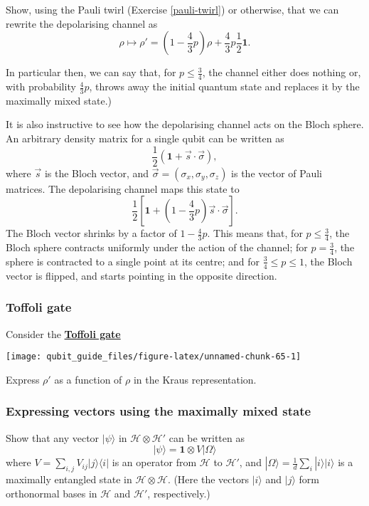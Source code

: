 \documentclass[fleqn]{article}
\begin{document}
Show, using the Pauli twirl (Exercise \ref{pauli-twirl}) or otherwise, that we can rewrite the depolarising channel as
\[
  \rho \longmapsto \rho'
  = \left(1-\frac{4}{3} p\right) \rho + \frac{4}{3}p\frac{1}{2}\mathbf{1}.
\]

In particular then, we can say that, for \(p\leqslant\frac34\), the channel either does nothing or, with probability \(\frac{4}{3}p\), throws away the initial quantum state and replaces it by the maximally mixed state.)

It is also instructive to see how the depolarising channel acts on the Bloch sphere.
An arbitrary density matrix for a single qubit can be written as
\[
  \frac{1}{2}(\mathbf{1}+\vec{s}\cdot\vec{\sigma}),
\]
where \(\vec{s}\) is the Bloch vector, and \(\vec{\sigma}=(\sigma_x,\sigma_y,\sigma_z)\) is the vector of Pauli matrices.
The depolarising channel maps this state to
\[
  \frac{1}{2}\left[
    \mathbf{1}+ \left(1-\frac{4}{3}p\right)\vec{s}\cdot\vec{\sigma}
  \right].
\]
The Bloch vector shrinks by a factor of \(1-\frac{4}{3}p\).
This means that, for \(p\leqslant\frac{3}{4}\), the Bloch sphere contracts uniformly under the action of the channel;
for \(p=\frac{3}{4}\), the sphere is contracted to a single point at its centre;
and for \(\frac{3}{4}\leqslant p\leqslant 1\), the Bloch vector is flipped, and starts pointing in the opposite direction.

\hypertarget{toffoli-gate}{%
\subsubsection{Toffoli gate}\label{toffoli-gate}}

Consider the \href{https://en.wikipedia.org/wiki/Toffoli_gate}{\textbf{Toffoli gate}}

\begin{center}\texttt{[image: qubit\_guide\_files/figure-latex/unnamed-chunk-65-1]} \end{center}

Express \(\rho'\) as a function of \(\rho\) in the Kraus representation.

\hypertarget{vector-expression-omega}{%
\subsubsection{Expressing vectors using the maximally mixed state}\label{vector-expression-omega}}

Show that any vector \(|\psi\rangle\) in \(\mathcal{H}\otimes\mathcal{H}'\) can be written as
\[
  |\psi\rangle
  = \mathbf{1}\otimes V|\Omega\rangle
\]
where \(V=\sum_{i,j}V_{ij}|j\rangle\langle i|\) is an operator from \(\mathcal{H}\) to \(\mathcal{H}'\), and \(|\Omega\rangle=\frac{1}{d}\sum_i|i\rangle|i\rangle\) is a maximally entangled state in \(\mathcal{H}\otimes\mathcal{H}\).
(Here the vectors \(|i\rangle\) and \(|j\rangle\) form orthonormal bases in \(\mathcal{H}\) and \(\mathcal{H}'\), respectively.)
\end{document}
